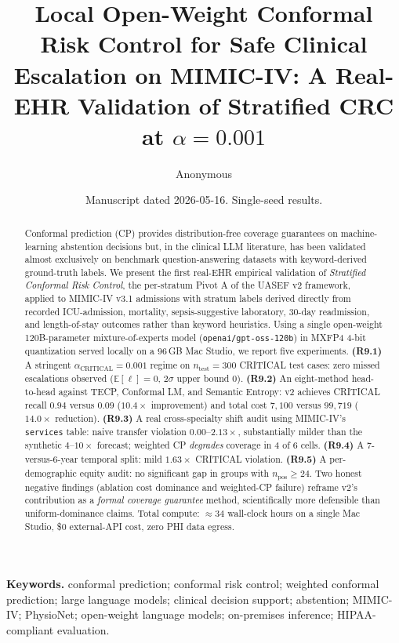 \documentclass[11pt,letterpaper]{article}
\title{\bfseries Local Open-Weight Conformal Risk Control for Safe Clinical Escalation on MIMIC-IV: A Real-EHR Validation of Stratified CRC at $\alpha = 0.001$}
\author{Anonymous}
\date{Manuscript dated 2026-05-16. Single-seed results.}
\newcommand{\Ex}{\mathbb{E}}
\begin{document}
\maketitle

\begin{abstract}\noindent
Conformal prediction (CP) provides distribution-free coverage guarantees on
machine-learning abstention decisions but, in the clinical LLM literature, has
been validated almost exclusively on benchmark question-answering datasets
with keyword-derived ground-truth labels. We present the first real-EHR
empirical validation of \emph{Stratified Conformal Risk Control}, the
per-stratum Pivot A of the UASEF v2 framework, applied to MIMIC-IV v3.1
admissions with stratum labels derived directly from recorded ICU-admission,
mortality, sepsis-suggestive laboratory, 30-day readmission, and
length-of-stay outcomes rather than keyword heuristics. Using a single
open-weight 120B-parameter mixture-of-experts model (\texttt{openai/gpt-oss-120b})
in MXFP4 4-bit quantization served locally on a 96\,GB Mac Studio, we report
five experiments. \textbf{(R9.1)} A stringent $\alpha_{\text{CRITICAL}} =
0.001$ regime on $n_{\text{test}} = 300$ CRITICAL test cases: zero missed
escalations observed ($\Ex[\ell] = 0$, 2$\sigma$ upper bound $0$).
\textbf{(R9.2)} An eight-method head-to-head against TECP, Conformal LM, and
Semantic Entropy: v2 achieves CRITICAL recall $0.94$ versus $0.09$ ($10.4\times$
improvement) and total cost $7{,}100$ versus $99{,}719$ ($14.0\times$
reduction). \textbf{(R9.3)} A real cross-specialty shift audit using
MIMIC-IV's \texttt{services} table: naive transfer violation $0.00$--$2.13\times$,
substantially milder than the synthetic $4$--$10\times$ forecast; weighted CP
\emph{degrades} coverage in 4 of 6 cells. \textbf{(R9.4)} A 7-versus-6-year
temporal split: mild $1.63\times$ CRITICAL violation. \textbf{(R9.5)} A
per-demographic equity audit: no significant gap in groups with
$n_{\text{pos}} \ge 24$. Two honest negative findings (ablation cost
dominance and weighted-CP failure) reframe v2's contribution as a
\emph{formal coverage guarantee} method, scientifically more defensible than
uniform-dominance claims. Total compute: $\approx 34$ wall-clock hours on a
single Mac Studio, \$0 external-API cost, zero PHI data egress.
\end{abstract}

\textbf{Keywords.} conformal prediction; conformal risk control; weighted
conformal prediction; large language models; clinical decision support;
abstention; MIMIC-IV; PhysioNet; open-weight language models; on-premises
inference; HIPAA-compliant evaluation.
\end{document}
